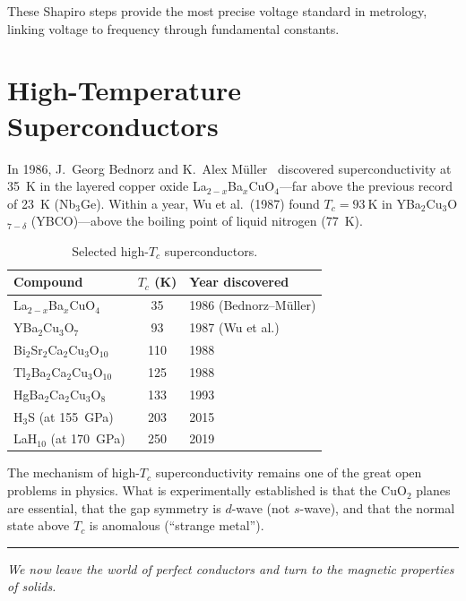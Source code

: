 These Shapiro steps provide the most precise voltage standard in metrology, linking voltage to frequency through fundamental constants.


\section{High-Temperature Superconductors}

In 1986, J.~Georg Bednorz and K.~Alex M\"uller~\cite{bednorz1988nobel} discovered superconductivity at \SI{35}{\kelvin} in the layered copper oxide La$_{2-x}$Ba$_x$CuO$_4$---far above the previous record of \SI{23}{\kelvin} (Nb$_3$Ge). Within a year, Wu et al.\ (1987) found $T_c = \SI{93}{\kelvin}$ in YBa$_2$Cu$_3$O$_{7-\delta}$ (YBCO)---above the boiling point of liquid nitrogen (\SI{77}{\kelvin}).

\begin{table}[H]
\centering
\caption{Selected high-$T_c$ superconductors.}
\label{tab:htsc}
\begin{tabular}{@{}lSl@{}}
\toprule
Compound & {$T_c$ (\si{\kelvin})} & Year discovered \\
\midrule
La$_{2-x}$Ba$_x$CuO$_4$ & 35 & 1986 (Bednorz--M\"uller) \\
YBa$_2$Cu$_3$O$_7$ & 93 & 1987 (Wu et al.) \\
Bi$_2$Sr$_2$Ca$_2$Cu$_3$O$_{10}$ & 110 & 1988 \\
Tl$_2$Ba$_2$Ca$_2$Cu$_3$O$_{10}$ & 125 & 1988 \\
HgBa$_2$Ca$_2$Cu$_3$O$_8$ & 133 & 1993 \\
H$_3$S (at \SI{155}{\giga\pascal}) & 203 & 2015 \\
LaH$_{10}$ (at \SI{170}{\giga\pascal}) & 250 & 2019 \\
\bottomrule
\end{tabular}
\end{table}

The mechanism of high-$T_c$ superconductivity remains one of the great open problems in physics. What is experimentally established is that the CuO$_2$ planes are essential, that the gap symmetry is $d$-wave (not $s$-wave), and that the normal state above $T_c$ is anomalous (``strange metal'').

\vspace{1cm}
\noindent\rule{\textwidth}{0.4pt}
\textit{We now leave the world of perfect conductors and turn to the magnetic properties of solids.}

